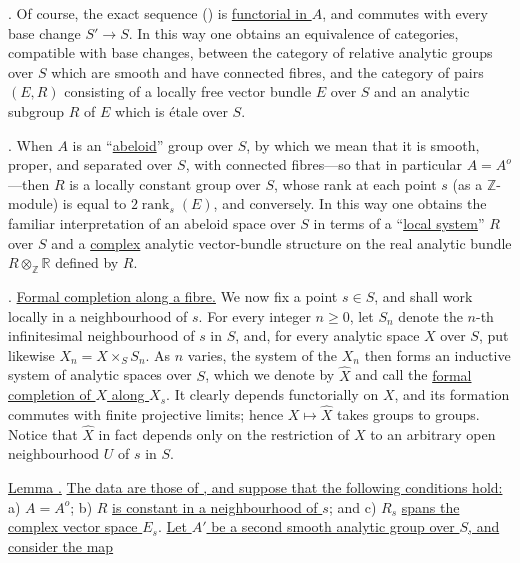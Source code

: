 \medskip
\noindent
{}. Of course, the exact sequence () is
\underline{functorial in $A$}, and commutes with every base change
$S'\longrightarrow S$. In this way one obtains an equivalence of
categories, compatible with base changes, between the category of
relative analytic groups over $S$ which are smooth and have connected
fibres, and the category of pairs $(E,R)$ consisting of a locally free
vector bundle $E$ over $S$ and an analytic subgroup $R$ of $E$ which is
\'etale over $S$.

\medskip
\noindent
{}. When $A$ is an ``\underline{abeloid}'' group over $S$, by which
we mean that it is smooth, proper, and separated over $S$, with connected
fibres---so that in particular $A=A^o$---then $R$ is a locally constant
group over $S$, whose rank at each point $s$ (as a $\mathbb Z$-module) is
equal to $2\operatorname{rank}_s(E)$, and conversely. In this way one
obtains the familiar interpretation of an abeloid space over $S$ in
terms of a ``\underline{local system}'' $R$ over $S$ and a
\underline{complex} analytic vector-bundle structure on the real
analytic bundle $R\otimes_{\mathbb Z}\mathbb R$ defined by $R$.

\medskip
\noindent
{}. \underline{Formal completion along a fibre.} We now fix a point
$s\in S$, and shall work locally in a neighbourhood of $s$. For every
integer $n\geqslant0$, let $S_n$ denote the $n$-th infinitesimal
neighbourhood of $s$ in $S$, and, for every analytic space $X$ over $S$,
put likewise $X_n=X\times_S S_n$. As $n$ varies, the system of the $X_n$
then forms an inductive system of analytic spaces over $S$, which we
denote by $\widehat X$ and call the \underline{formal completion of $X$
along $X_s$}. It clearly depends functorially on $X$, and its formation
commutes with finite projective limits; hence $X\longmapsto\widehat X$
takes groups to groups. Notice that $\widehat X$ in fact depends only on
the restriction of $X$ to an arbitrary open neighbourhood $U$ of $s$ in
$S$.

\medskip
\noindent
\underline{Lemma .} \underline{The data are those of , and
suppose that the following conditions hold:} a) $A=A^o$;
b) $R$ \underline{is constant in a neighbourhood of $s$}; and
c) $R_s$ \underline{spans the complex vector space $E_s$}.
\underline{Let $A'$ be a second smooth analytic group over $S$, and
consider the map}

